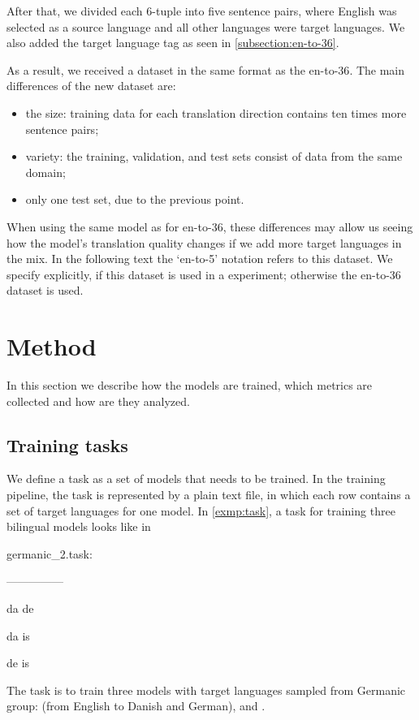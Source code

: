After that, we divided each 6-tuple into five sentence pairs,
where English was selected as a source language and all other languages were target languages. We also added the target language tag as seen in  \cref{subsection:en-to-36}.

As a result, we received a dataset in the same format as the \gls{en-to-36}.
The main differences of the new dataset are:
\begin{itemize}
	\item the size: training data for each translation direction
		contains ten times more sentence pairs;
	\item variety: the training, validation, and test sets
		consist of data from the same domain;
	\item only one test set, due to the previous point.
\end{itemize}
When using the same model as for \gls{en-to-36}, these differences may
allow us seeing how the model's translation quality changes if we add
more target languages in the mix.
In the following text the `en-to-5' notation refers to this dataset.
We specify explicitly, if this dataset is used in a experiment;
otherwise the en-to-36 dataset is used.


\section{Method}
\label{section:method}

In this section we describe how the models are trained, which metrics
are collected and how are they analyzed.


\subsection{Training tasks}
\label{section:training_tasks}

We define a task as a set of models that needs to be trained.
In the training pipeline, the task is represented by a plain text file,
in which each row contains a set of target languages for one model.
In \cref{exmp:task}, a task for training three bilingual models looks like in

\vspace{\baselineskip}
\begin{minipage}[t]{0.9\textwidth}
    germanic\_2.task:
    
    ---------------
    
    da de
    
    da is
    
    de is

	\begin{exmp}
	The task is to train three models with target languages sampled from
	Germanic group:  (from English to Danish and German),
	 and .

	\label{exmp:task}
	\end{exmp}
\end{minipage}
\vspace{\baselineskip}


